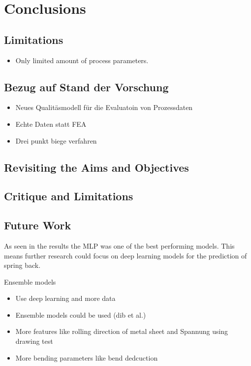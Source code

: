 \chapter{Conclusions}


\section{Limitations}

\begin{itemize}
    \item Only limited amount of process parameters.
\end{itemize}


\section{Bezug auf Stand der Vorschung}

\begin{itemize}
    \item Neues Qualitäsmodell für die Evaluatoin von Prozessdaten
    \item Echte Daten statt FEA
    \item Drei punkt biege verfahren
\end{itemize}


\section{Revisiting the Aims and Objectives}


\section{Critique and Limitations}


\section{Future Work}\label{sec:future-work}

As seen in the results the \ac{MLP} was one of the best performing models.
This means further research could focus on deep learning models for the prediction of
spring back.

Ensemble models


\begin{itemize}
    \item Use deep learning and more data
    \item Ensemble models could be used (dib et al.)
    \item More features like rolling direction of metal sheet and Spannung using
    drawing test
    \item More bending parameters like bend dedcuction
\end{itemize}


